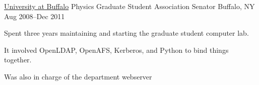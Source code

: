 


\begin{cventries}

  \cventry
    {\href{www.buffalo.edu}{University at Buffalo}}
    {Physics Graduate Student Association Senator}
    {Buffalo, NY} {Aug 2008--Dec 2011}
    {
    \begin{cvitems}
      \item  Spent three years maintaining and starting the graduate student computer lab.
      \item It involved OpenLDAP, OpenAFS, Kerberos, and Python to bind things together.
      \item Was also in charge of the department webserver
    \end{cvitems}
    }


\end{cventries}


